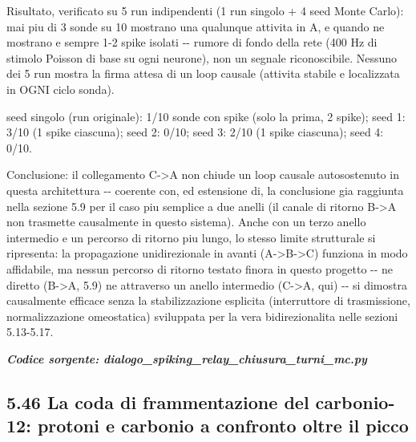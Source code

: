 \documentclass[
  italian,
]{article}
\begin{document}
Risultato, verificato su 5 run indipendenti (1 run singolo + 4 seed Monte Carlo): mai piu\textquotesingle{} di 3 sonde su 10 mostrano una qualunque attivita\textquotesingle{} in A, e quando ne mostrano e\textquotesingle{} sempre 1-2 spike isolati -\/- rumore di fondo della rete (400 Hz di stimolo Poisson di base su ogni neurone), non un segnale riconoscibile. Nessuno dei 5 run mostra la firma attesa di un loop causale (attivita\textquotesingle{} stabile e localizzata in OGNI ciclo sonda).

seed singolo (run originale): 1/10 sonde con spike (solo la prima, 2 spike); seed 1: 3/10 (1 spike ciascuna); seed 2: 0/10; seed 3: 2/10 (1 spike ciascuna); seed 4: 0/10.

Conclusione: il collegamento C-\textgreater A non chiude un loop causale autosostenuto in questa architettura -\/- coerente con, ed estensione di, la conclusione gia\textquotesingle{} raggiunta nella sezione 5.9 per il caso piu\textquotesingle{} semplice a due anelli (il canale di ritorno B-\textgreater A non trasmette causalmente in questo sistema). Anche con un terzo anello intermedio e un percorso di ritorno piu\textquotesingle{} lungo, lo stesso limite strutturale si ripresenta: la propagazione unidirezionale in avanti (A-\textgreater B-\textgreater C) funziona in modo affidabile, ma nessun percorso di ritorno testato finora in questo progetto -\/- ne\textquotesingle{} diretto (B-\textgreater A, 5.9) ne\textquotesingle{} attraverso un anello intermedio (C-\textgreater A, qui) -\/- si dimostra causalmente efficace senza la stabilizzazione esplicita (interruttore di trasmissione, normalizzazione omeostatica) sviluppata per la vera bidirezionalita\textquotesingle{} nelle sezioni 5.13-5.17.

\textit{\textbf{Codice sorgente: dialogo\_\allowbreak{}spiking\_\allowbreak{}relay\_\allowbreak{}chiusura\_\allowbreak{}turni\_\allowbreak{}mc.py}}


\subsection{5.46 La coda di frammentazione del carbonio-12: protoni e carbonio a confronto oltre il picco}\label{la-coda-di-frammentazione-del-carbonio-12-protoni-e-carbonio-a-confronto-oltre-il-picco}
\end{document}
